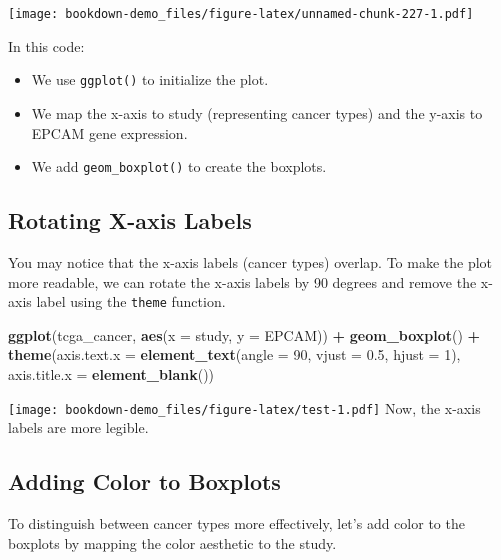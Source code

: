 \documentclass[
]{book}
\newenvironment{Shaded}{\begin{snugshade}}{\end{snugshade}}
\newcommand{\AttributeTok}[1]{\textcolor[rgb]{0.13,0.29,0.53}{#1}}
\newcommand{\DecValTok}[1]{\textcolor[rgb]{0.00,0.00,0.81}{#1}}
\newcommand{\FloatTok}[1]{\textcolor[rgb]{0.00,0.00,0.81}{#1}}
\newcommand{\FunctionTok}[1]{\textcolor[rgb]{0.13,0.29,0.53}{\textbf{#1}}}
\newcommand{\NormalTok}[1]{#1}
\newcommand{\SpecialCharTok}[1]{\textcolor[rgb]{0.81,0.36,0.00}{\textbf{#1}}}
\begin{document}
\texttt{[image: bookdown-demo\_files/figure-latex/unnamed-chunk-227-1.pdf]}

In this code:

\begin{itemize}
\item
  We use \texttt{ggplot()} to initialize the plot.
\item
  We map the x-axis to study (representing cancer types) and the y-axis to EPCAM gene expression.
\item
  We add \texttt{geom\_boxplot()} to create the boxplots.
\end{itemize}

\hypertarget{rotating-x-axis-labels}{%
\subsection{Rotating X-axis Labels}\label{rotating-x-axis-labels}}

You may notice that the x-axis labels (cancer types) overlap. To make the plot more readable, we can rotate the x-axis labels by 90 degrees and remove the x-axis label using the \texttt{theme} function.

\begin{Shaded}
\begin{Highlighting}[]
\FunctionTok{ggplot}\NormalTok{(tcga\_cancer, }\FunctionTok{aes}\NormalTok{(}\AttributeTok{x =}\NormalTok{ study, }\AttributeTok{y =}\NormalTok{ EPCAM)) }\SpecialCharTok{+}
  \FunctionTok{geom\_boxplot}\NormalTok{() }\SpecialCharTok{+}
  \FunctionTok{theme}\NormalTok{(}\AttributeTok{axis.text.x =} \FunctionTok{element\_text}\NormalTok{(}\AttributeTok{angle =} \DecValTok{90}\NormalTok{, }\AttributeTok{vjust =} \FloatTok{0.5}\NormalTok{, }\AttributeTok{hjust =} \DecValTok{1}\NormalTok{),}
        \AttributeTok{axis.title.x =} \FunctionTok{element\_blank}\NormalTok{())}
\end{Highlighting}
\end{Shaded}

\texttt{[image: bookdown-demo\_files/figure-latex/test-1.pdf]}
Now, the x-axis labels are more legible.

\hypertarget{adding-color-to-boxplots}{%
\subsection{Adding Color to Boxplots}\label{adding-color-to-boxplots}}

To distinguish between cancer types more effectively, let's add color to the boxplots by mapping the color aesthetic to the study.
\end{document}
